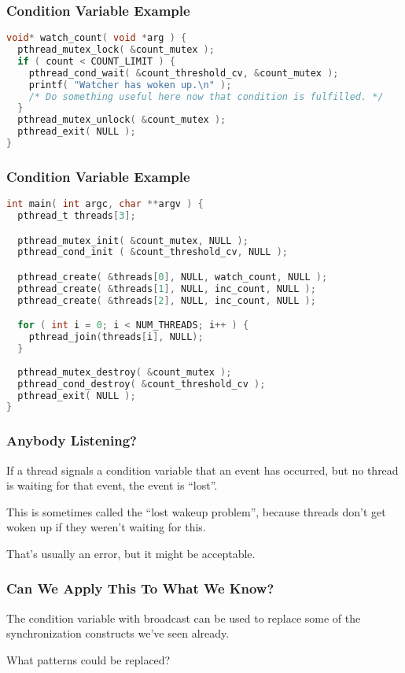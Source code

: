 \begin{frame}[fragile]
	\frametitle{Condition Variable Example}

	\begin{lstlisting}[language=C]
void* watch_count( void *arg ) {
  pthread_mutex_lock( &count_mutex );  
  if ( count < COUNT_LIMIT ) {
    pthread_cond_wait( &count_threshold_cv, &count_mutex );
    printf( "Watcher has woken up.\n" );
    /* Do something useful here now that condition is fulfilled. */
  }
  pthread_mutex_unlock( &count_mutex );
  pthread_exit( NULL );
}
\end{lstlisting}
\end{frame}

\begin{frame}[fragile]
	\frametitle{Condition Variable Example}
	\begin{lstlisting}[language=C]
int main( int argc, char **argv ) {
  pthread_t threads[3];

  pthread_mutex_init( &count_mutex, NULL );
  pthread_cond_init ( &count_threshold_cv, NULL );

  pthread_create( &threads[0], NULL, watch_count, NULL );
  pthread_create( &threads[1], NULL, inc_count, NULL );
  pthread_create( &threads[2], NULL, inc_count, NULL );

  for ( int i = 0; i < NUM_THREADS; i++ ) {
    pthread_join(threads[i], NULL);
  }
  
  pthread_mutex_destroy( &count_mutex );
  pthread_cond_destroy( &count_threshold_cv );
  pthread_exit( NULL );
}
\end{lstlisting}
\end{frame}


\begin{frame}
	\frametitle{Anybody Listening?}

	If a thread signals a condition variable that an event has occurred, but no thread is waiting for that event, the event is ``lost''.

	This is sometimes called the ``lost wakeup problem'', because threads don't get woken up if they weren't waiting for this.

	That's usually an error, but it might be acceptable.

\end{frame}

\begin{frame}
	\frametitle{Can We Apply This To What We Know?}

	The condition variable with broadcast can be used to replace some of the synchronization constructs we've seen already.

	What patterns could be replaced?

\end{frame}

